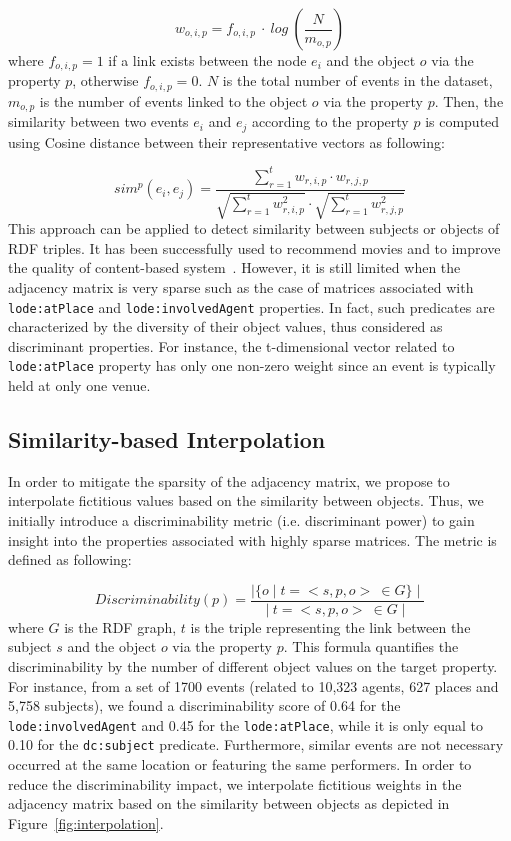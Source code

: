 \begin{equation} \label{eq:weight}
w_{o,i,p}=f_{o,i,p} \ \cdot \ log \ \left(\frac {N}{m_{o,p}}\right)
\end{equation}
where $f_{o,i,p} = 1$ if a link exists between the node $e_{i}$ and the object $o$ via the property $p$, otherwise $f_{o,i,p}=0$. $N$ is the total number of events in the dataset, $m_{o,p}$ is the number of events linked to the object $o$ via the property $p$. Then, the similarity between two events $e_{i}$ and $e_{j}$ according to the property $p$ is computed using Cosine distance between their representative vectors as following:

\begin{equation}
sim^{p}(e_{i},e_{j})=\frac {\sum_{r=1}^{t} w_{r,i,p} \cdot w_{r,j,p}} {\sqrt{\sum_{r=1}^{t} w^{2}_{r,i,p}} \cdot \sqrt{\sum_{r=1}^{t} w^{2}_{r,j,p}}}
\end{equation}
This approach can be applied to detect similarity between subjects or objects of RDF triples. It has been successfully used to recommend movies and to improve the quality of content-based system~\cite{DiNoia:SEMANTICS12}. However, it is still limited when the adjacency matrix is very sparse such as the case of matrices associated with \texttt{lode:atPlace} and \texttt{lode:involvedAgent} properties. In fact, such predicates are characterized by the diversity of their object values, thus considered as discriminant properties. For instance, the t-dimensional vector related to \texttt{lode:atPlace} property has only one non-zero weight since an event is typically held at only one venue.


\subsection{Similarity-based Interpolation}

In order to mitigate the sparsity of the adjacency matrix, we propose to interpolate fictitious values based on the similarity between objects. Thus, we initially introduce a discriminability metric (i.e. discriminant power) to gain insight into the properties associated with highly sparse matrices. The metric is defined as following:

\begin{equation}
 Discriminability(p) = \frac{\mid{\{o\mid t=<s,p,o>\ \in G\}}\mid}{\mid{\ t=<s,p,o>\ \in G \mid}}
\end{equation}
where $G$ is the RDF graph, $t$ is the triple representing the link between the subject $s$ and the object $o$ via the property $p$. This formula quantifies the discriminability by the number of different object values on the target property. For instance, from a set of 1700 events (related to 10,323 agents, 627 places and 5,758 subjects), we found a discriminability score of 0.64 for the \texttt{lode:involvedAgent} and 0.45 for the \texttt{lode:atPlace}, while it is only equal to 0.10 for the \texttt{dc:subject} predicate. Furthermore, similar events are not necessary occurred at the same location or featuring the same performers. In order to reduce the discriminability impact, we interpolate fictitious weights in the adjacency matrix based on the similarity between objects as depicted in Figure~\ref{fig:interpolation}. 

